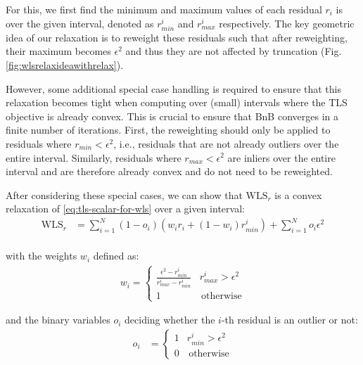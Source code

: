 For this, we first find the minimum and maximum values of each residual $r_i$ is over the given interval, denoted as $r_{min}^i$ and $r_{max}^i$ respectively. The key geometric idea of our relaxation is to reweight these residuals such that after reweighting, their maximum becomes $\epsilon^2$ and thus they are not affected by truncation (Fig. \ref{fig:wlsrelaxideawithrelax}).

However, some additional special case handling is required to ensure that this relaxation becomes tight when computing over (small) intervals where the TLS objective is already convex. This is crucial to ensure that BnB converges in a finite number of iterations. First, the reweighting should only be applied to residuals where $r_{min} < \epsilon^2$, i.e., residuals that are not already outliers over the entire interval. Similarly, residuals where $r_{max} < \epsilon^2$ are inliers over the entire interval and are therefore already convex and do not need to be reweighted.

After considering these special cases, we can show that $\text{WLS}_{r}$ is a convex relaxation of \ref{eq:tls-scalar-for-wls} over a given interval:
\begin{equation}
	\label{eq:tls-wls-relaxation1}
	\begin{aligned}	
		\text{WLS}_{r} &= 
		\sum_{i=1}^{N} (1 - o_i) \left(w_i r_i  + (1 - w_i) r_{min}^i \right) + \sum_{i=1}^{N} o_i\epsilon^2\\
	\end{aligned}
\end{equation}

with the weights $w_i$ defined as:
\begin{equation}
	\begin{aligned}	
		w_i  = 
		\begin{cases}
			\frac{\epsilon^2 - r_{min}^i}{r_{max}^i - r_{min}^i} &  r_{max}^i > \epsilon^2\\
			1 & \, \text{otherwise}
		\end{cases}
	\end{aligned}
\end{equation}

and the binary variables $o_i$ deciding whether the $i$-th residual is an outlier or not:
\begin{equation}
	\begin{aligned}	
		o_i &= \begin{cases}
			1 &  r_{min}^i > \epsilon^2\\
			0 & \, \text{otherwise}
		\end{cases}
	\end{aligned}
\end{equation}


